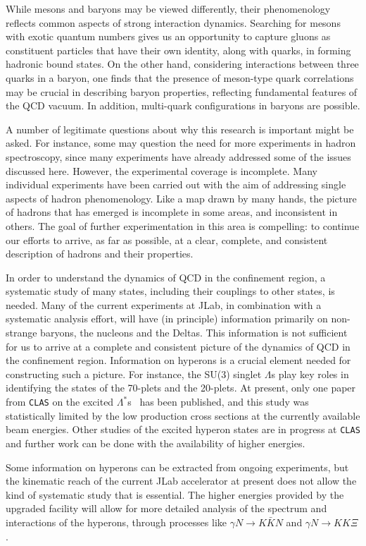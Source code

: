While mesons and baryons may be viewed differently, their phenomenology 
reflects common aspects of strong interaction dynamics. Searching for 
mesons with exotic quantum numbers gives us an opportunity to capture 
gluons as constituent particles that have their own identity, along with 
quarks, in forming hadronic bound states. On the other hand, considering 
interactions between three quarks in a baryon, one finds that the presence 
of meson-type quark correlations may be crucial in describing baryon 
properties, reflecting fundamental features of the QCD vacuum. In addition, 
multi-quark configurations in baryons are possible.

A number of legitimate questions about why this research is important
might be asked. For instance, some may question the need for more
experiments in hadron spectroscopy, since many experiments have already
addressed some of the issues discussed here. However, the experimental
coverage is incomplete. Many individual experiments have been carried out
with the aim of addressing single aspects of hadron phenomenology. Like a
map drawn by many hands, the picture of hadrons that has emerged is
incomplete in some areas, and inconsistent in others.  The goal of further
experimentation in this area is compelling: to continue our efforts to
arrive, as far as possible, at a clear, complete, and consistent
description of hadrons and their properties.

In order to understand the dynamics of QCD in the confinement region, a 
systematic study of many states, including their couplings to other states, 
is needed. Many of the current experiments at JLab, in combination with a 
systematic analysis effort, will have (in principle) information primarily 
on non-strange baryons, the nucleons and the Deltas. This information is 
not sufficient for us to arrive at a complete and consistent picture of 
the dynamics of QCD in the confinement region. Information on hyperons is
a crucial element needed for constructing such a picture. For instance,
the SU(3) singlet $\Lambda$s play key roles in identifying the states of
the 70-plets and the 20-plets.  At present, only one paper from {\tt CLAS} 
on the excited $\Lambda^*$s~\cite{barrow} has been published, and 
this study was statistically limited by the low production cross 
sections at the currently available beam energies.  Other studies of the 
excited hyperon states are in progress at {\tt CLAS} and further work can 
be done with the availability of higher energies. 

Some information on hyperons can be extracted from ongoing experiments,
but the kinematic reach of the current JLab accelerator at present does 
not allow the kind of systematic study that is essential.  The higher 
energies provided by the upgraded facility will allow for more detailed 
analysis of the spectrum and interactions of the hyperons, through 
processes like $\gamma N \to K \bar{K} N$ and $\gamma N \to KK\Xi$. 

